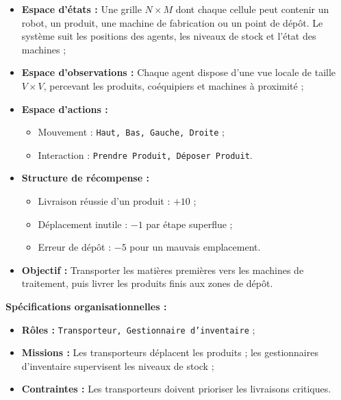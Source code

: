 \begin{itemize}
    \item \textbf{Espace d'états :} Une grille $N \times M$ dont chaque cellule peut contenir un robot, un produit, une machine de fabrication ou un point de dépôt. Le système suit les positions des agents, les niveaux de stock et l'état des machines ;
    \item \textbf{Espace d'observations :} Chaque agent dispose d'une vue locale de taille $V \times V$, percevant les produits, coéquipiers et machines à proximité ;
    \item \textbf{Espace d'actions :}
          \begin{itemize}
              \item Mouvement : \texttt{Haut, Bas, Gauche, Droite} ;
              \item Interaction : \texttt{Prendre Produit, Déposer Produit}.
          \end{itemize}
    \item \textbf{Structure de récompense :}
          \begin{itemize}
              \item Livraison réussie d'un produit : $+10$ ;
              \item Déplacement inutile : $-1$ par étape superflue ;
              \item Erreur de dépôt : $-5$ pour un mauvais emplacement.
          \end{itemize}
    \item \textbf{Objectif :} Transporter les matières premières vers les machines de traitement, puis livrer les produits finis aux zones de dépôt.
\end{itemize}

\textbf{Spécifications organisationnelles :}
\begin{itemize}
    \item \textbf{Rôles :} \texttt{Transporteur, Gestionnaire d'inventaire} ;
    \item \textbf{Missions :} Les transporteurs déplacent les produits ; les gestionnaires d'inventaire supervisent les niveaux de stock ;
    \item \textbf{Contraintes :} Les transporteurs doivent prioriser les livraisons critiques.
\end{itemize}

